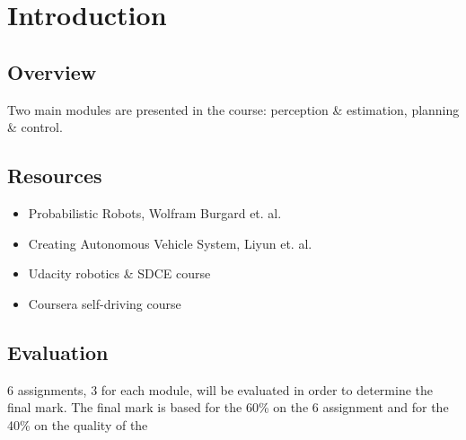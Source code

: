 \chapter{Introduction}

\section{Overview}
Two main modules are presented in the course: perception \& estimation, planning \& control.

\section{Resources}
\begin{itemize}
  \item Probabilistic Robots, Wolfram Burgard et. al.
  \item Creating Autonomous Vehicle System, Liyun et. al.
  \item Udacity robotics \& SDCE course
  \item Coursera self-driving course
\end{itemize}

\section{Evaluation}
6 assignments, 3 for each module, will be evaluated in order to determine the final mark.
The final mark is based for the 60\% on the 6 assignment and for the 40\% on the quality of the 